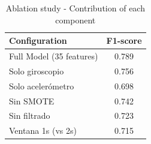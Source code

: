 \begin{table}[H]
\centering
\caption{Ablation study - Contribution of each component}
\label{tab:ablation}
\begin{tabular}{lc}
\toprule
\textbf{Configuration} & \textbf{F1-score} \\
\midrule
Full Model (35 features) & 0.789 \\
Solo giroscopio & 0.756 \\
Solo acelerómetro & 0.698 \\
Sin SMOTE & 0.742 \\
Sin filtrado & 0.723 \\
Ventana 1s (vs 2s) & 0.715 \\
\bottomrule
\end{tabular}
\end{table}
